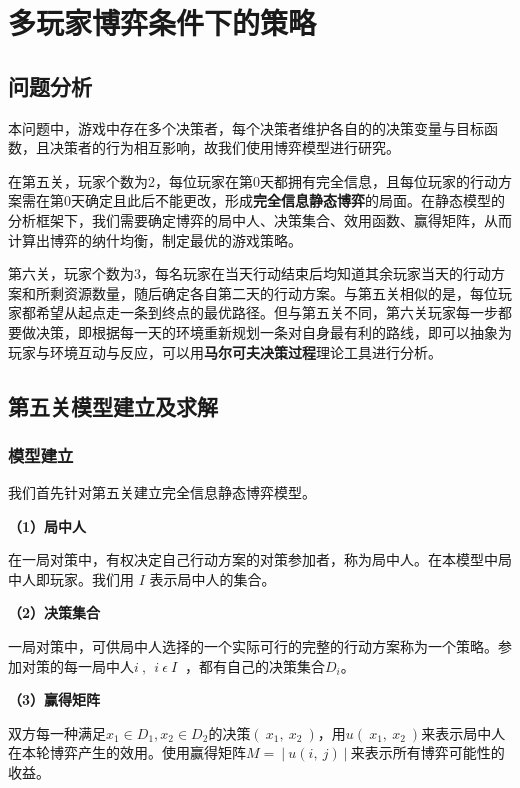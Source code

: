 \documentclass[bwprint]{cumcmthesis} %
\begin{document}
\section{多玩家博弈条件下的策略}
\label{sec:simulate}


\subsection{问题分析}

本问题中，游戏中存在多个决策者，每个决策者维护各自的的决策变量与目标函数，且决策者的行为相互影响，故我们使用博弈模型进行研究。

在第五关，玩家个数为2，每位玩家在第0天都拥有完全信息，且每位玩家的行动方案需在第0天确定且此后不能更改，形成\textbf{完全信息静态博弈}的局面。在静态模型的分析框架下，我们需要确定博弈的局中人、决策集合、效用函数、赢得矩阵，从而计算出博弈的纳什均衡，制定最优的游戏策略。

第六关，玩家个数为3，每名玩家在当天行动结束后均知道其余玩家当天的行动方案和所剩资源数量，随后确定各自第二天的行动方案。与第五关相似的是，每位玩家都希望从起点走一条到终点的最优路径。但与第五关不同，第六关玩家每一步都要做决策，即根据每一天的环境重新规划一条对自身最有利的路线，即可以抽象为玩家与环境互动与反应，可以用\textbf{马尔可夫决策过程}理论工具进行分析。


\subsection{第五关模型建立及求解}

\subsubsection{模型建立}
我们首先针对第五关建立完全信息静态博弈模型。

\textbf{（1）局中人}

在一局对策中，有权决定自己行动方案的对策参加者，称为局中人。在本模型中局中人即玩家。我们用 $I$ 表示局中人的集合。

\textbf{（2）决策集合}

一局对策中，可供局中人选择的一个实际可行的完整的行动方案称为一个策略。参加对策的每一局中人$ i\ ,\ \ i\ \epsilon\ I\ $ ，都有自己的决策集合$ D_i $。

\textbf{（3）赢得矩阵}

双方每一种满足$ x_1 \in D_1, x_2 \in D_2$的决策$({\ x}_1,\ x_2\ )$，用$u({\ x}_1,\ x_2\ )$来表示局中人在本轮博弈产生的效用。使用赢得矩阵$ M={\ |\ u(i,\ j)\ |\ } $来表示所有博弈可能性的收益。
\end{document}
